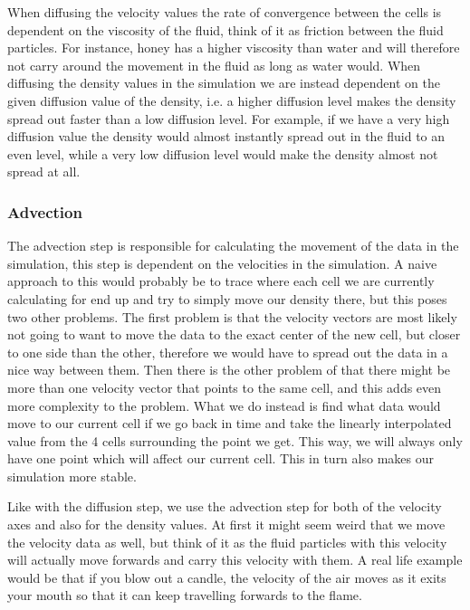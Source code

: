\documentclass{article}
\begin{document}
\begin{multicols}{2}
When diffusing the velocity values the rate of convergence between the cells is dependent on the viscosity of the fluid, think of it as friction between the fluid particles. For instance, honey has a higher viscosity than water and will therefore not carry around the movement in the fluid as long as water would. When diffusing the density values in the simulation we are instead dependent on the given diffusion value of the density, i.e. a higher diffusion level makes the density spread out faster than a low diffusion level. For example, if we have a very high diffusion value the density would almost instantly spread out in the fluid to an even level, while a very low diffusion level would make the density almost not spread at all.

\subsubsection{Advection}
The advection step is responsible for calculating the movement of the data in the simulation, this step is dependent on the velocities in the simulation. A naive approach to this would probably be to trace where each cell we are currently calculating for end up and try to simply move our density there, but this poses two other problems. The first problem is that the velocity vectors are most likely not going to want to move the data to the exact center of the new cell, but closer to one side than the other, therefore we would have to spread out the data in a nice way between them. Then there is the other problem of that there might be more than one velocity vector that points to the same cell, and this adds even more complexity to the problem. What we do instead is find what data would move to our current cell if we go back in time and take the linearly interpolated value from the 4 cells surrounding the point we get. This way, we will always only have one point which will affect our current cell. This in turn also makes our simulation more stable.

Like with the diffusion step, we use the advection step for both of the velocity axes and also for the density values. At first it might seem weird that we move the velocity data as well, but think of it as the fluid particles with this velocity will actually move forwards and carry this velocity with them. A real life example would be that if you blow out a candle, the velocity of the air moves as it exits your mouth so that it can keep travelling forwards to the flame.


\end{multicols}
\end{document}
